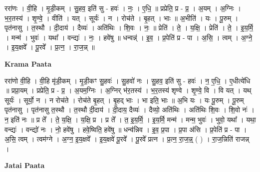 \documentclass[17pt]{extarticle}
\begin{document}
ररा॑णः । वी॒हि । मृ॒डी॒कम् । सु॒हव॒ इति॑ सु - हवः॑ । नः॒ । ए॒धि॒ ॥ प्रप्रेति॒ प्र - प्र॒ । अ॒यम् । अ॒ग्निः । भ॒र॒तस्य॑ । शृ॒ण्वे॒ । वीति॑ । यत् । सूर्यः॑ । न । रोच॑ते । बृ॒हत् । भाः ॥ अ॒भीति॑ । यः । पू॒रुम् । पृत॑नासु । त॒स्थौ । दी॒दाय॑ । दैव्यः॑ । अति॑थिः । शि॒वः । नः॒ ॥ प्रेति॑ । ते॒ । य॒क्षि॒ । प्रेति॑ । ते॒ । इ॒य॒र्मि॒ । मन्म॑ । भुवः॑ । यथा᳚ । वन्द्यः॑ । नः॒ । हवे॑षु ॥ धन्वन्न्॑ । इ॒व॒ । प्र॒पेति॑ प्र - पा । अ॒सि॒ । त्वम् । अ॒ग्ने॒ । इ॒य॒क्षवे᳚ । पू॒रवे᳚ । प्र॒त्न॒ । रा॒ज॒न्न् ॥  \newline


\textbf{Krama Paata} \newline

ररा॑णो वी॒हि । वी॒हि मृ॑डी॒कम् । मृ॒डी॒कꣳ सु॒हवः॑ । सु॒हवो॑ नः । सु॒हव॒ इति॑ सु - हवः॑ । न॒ ए॒धि॒ । ए॒धीत्ये॑धि ॥ प्रप्रा॒यम् । प्रप्रेति॒ प्र - प्र॒ । अ॒यम॒ग्निः । अ॒ग्निर् भ॑र॒तस्य॑ । भ॒र॒तस्य॑ शृण्वे । शृ॒ण्वे॒ वि । वि यत् । यथ् सूर्यः॑ । सूर्यो॒ न । न रोच॑ते । रोच॑ते बृ॒हत् । बृ॒हद् भाः । भा इति॒ भाः ॥ अ॒भि यः । यः पू॒रुम् । पू॒रुम् पृत॑नासु । पृत॑नासु त॒स्थौ । त॒स्थौ दी॒दाय॑ । दी॒दाय॒ दैव्यः॑ । दैव्यो॒ अति॑थिः । अति॑थिः शि॒वः । शि॒वो नः॑ । न॒ इति॑ नः ॥ प्र ते᳚ । ते॒ य॒क्षि॒ । य॒क्षि॒ प्र । प्र ते᳚ । त॒ इ॒य॒र्मि॒ । इ॒य॒र्मि॒ मन्म॑ । मन्म॒ भुवः॑ । भुवो॒ यथा᳚ । यथा॒ वन्द्यः॑ । वन्द्यो॑ नः । नो॒ हवे॑षु । हवे॒ष्विति॒ हवे॑षु ॥ धन्व॑न्निव । इ॒व॒ प्र॒पा । प्र॒पा अ॑सि । प्र॒पेति॑ प्र - पा । अ॒सि॒ त्वम् । त्वम॑ग्ने । अ॒ग्न॒ इ॒य॒क्षवे᳚ । इ॒य॒क्षवे॑ पू॒रवे᳚ । पू॒रवे᳚ प्रत्न । प्र॒त्न॒ रा॒ज॒न्न्॒ ( ) । रा॒ज॒न्निति॑ राजन्न् । \newline

\textbf{Jatai Paata} \newline
\end{document}
